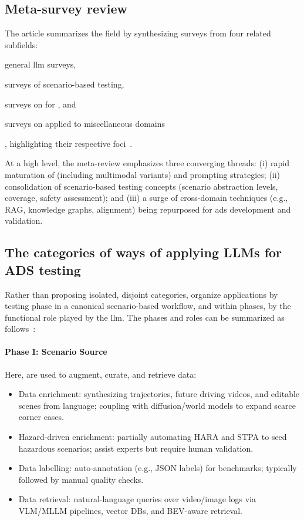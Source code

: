 \subsection{Meta-survey review}

The article summarizes the field by synthesizing surveys from four related
subfields:
\begin{inparaenum}
    \item general \acrshort{llm} surveys,
    \item surveys of scenario-based testing,
    \item surveys on  for , and
    \item surveys on  applied to miscellaneous domains
\end{inparaenum}, highlighting their respective
foci~\cite[p.~2]{surveyLLMScenarioBasedTesting}.

At a high level, the meta-review emphasizes three converging threads: (i) rapid
maturation of  (including multimodal variants) and prompting
strategies; (ii) consolidation of scenario-based testing concepts (scenario
abstraction levels, coverage, safety assessment); and (iii) a surge of
cross-domain techniques (e.g., RAG, knowledge graphs, alignment) being
repurposed for \acrshort{ads} development and validation.

\subsection{The categories of ways of applying LLMs for ADS testing}

Rather than proposing isolated, disjoint categories,
\citeauthor{surveyLLMScenarioBasedTesting} organize applications by testing
phase in a canonical scenario-based workflow, and within phases, by the
functional role played by the \acrshort{llm}. The phases and roles can be
summarized as follows~\cite{surveyLLMScenarioBasedTesting}:

\paragraph{Phase I: Scenario Source}
Here,  are used to augment, curate, and retrieve data:
\begin{itemize}
    \item Data enrichment: synthesizing trajectories, future driving videos, and
    editable scenes from language; coupling  with
    diffusion/world models to expand scarce corner cases.
    \item Hazard-driven enrichment: partially automating HARA and STPA to seed
    hazardous scenarios;  assist experts but require human
    validation.
    \item Data labelling: auto-annotation (e.g., JSON labels) for benchmarks;
    typically followed by manual quality checks.
    \item Data retrieval: natural-language queries over video/image logs via
    VLM/MLLM pipelines, vector DBs, and BEV-aware retrieval.
\end{itemize}

